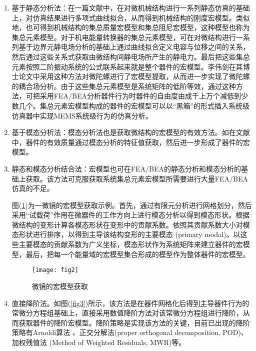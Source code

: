 \documentclass[no-math]{YangThesis}
\begin{document}
\begin{enumerate}[fullwidth, label=(\arabic*), itemindent=2em]
\item  基于静态分析法：在一篇文献\cite{bibc43}中，在对微机械结构进行一系列静态仿真的基础上，对仿真结果进行多项式曲线拟合，从而得到机械结构的刚度宏模型。类似地，也可得到机械结构的集总质量宏模型和集总阻尼宏模型，这种模型也称为集总元素模型。对于机电能量转换器的集总元素模型，可在对微结构进行一系列基于边界元静电场分析的基础上通过曲线拟合定义电容与位移之间的关系，然后通过这些关系式获取由微结构间静电场所产生的静电力。最后把这些集总元素按照二阶振动系统的公式联系起来就是整个器件的宏模型。李伟剑在其博士论文\cite{bibc44}中采用这种方法对微陀螺进行了宏模型提取，从而进一步实现了微陀螺的耦合场分析。由于这些集总元素模型是系统矩阵的低阶等效，通过这种方法，可把采用FEA/BEA分析器件行为时器件的自由度由成千上万个减低到少数几个。集总元素宏模型构成的器件的宏模型可以以“黑箱”的形式插入系统级仿真器中实现MEMS系统级行为的仿真分析。

\item 基于模态分析法：模态分析法也是获取微结构的宏模型的有效方法。如在文献\cite{bibc45}中，器件的有效质量通过模态分析的特征值获取，然后进一步形成了器件的宏模型。

\item 静态和模态分析结合法：宏模型也可在FEA/BEA的静态分析和模态分析的基础上获取。该方法可克服获取系统集总元素宏模型所需要进行大量FEA/BEA仿真的不足。

\hspace{2em} 图(\ref{fig2})为一微镜的宏模型获取示例\cite{bibc46}。首先，通过有限元分析进行网格划分，然后采用“试载荷”作用在微器件的工作方向上进行模态分析以得到模态形状。根据微结构的变形计算各模态形状在变形中的贡献系数。依照其贡献系数大小对模态形状进行排序，以得到主导该结构变形的主要模态 (primary modal)。以这些主要模态的贡献系数为广义坐标，模态形状作为系统矩阵来建立器件的宏模型，最后，把每一个能量域的宏模型集合形成的模型作为整体器件的宏模型。

\begin{figure}[!htbp]
	\centering
	\texttt{[image: fig2]}
	\caption{微镜的宏模型获取}
     \label{fig2}
\end{figure}

\item 直接降阶法。如图(\ref{fig3})所示，该方法是在器件网格化后得到主导器件行为的常微分方程组基础上，直接采用数值降阶方法对该常微分方程组进行降阶，从而获取器件的降阶宏模型。降阶策略是实现该方法的关键，目前已出现的降阶策略有Arnoldi算法\cite{bibc47} 、正交分解法\cite{bibc48}(proper orthogonal decomposition, POD)、加权残值法 (Method of Weighted Residuals, MWR)\cite{bibc49}等。
\end{enumerate}
\end{document}

